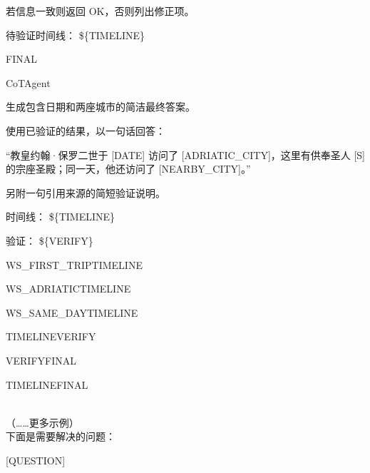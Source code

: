 \begin{userprompt}[title={用户提示词}]
若信息一致则返回 OK，否则列出修正项。

待验证时间线：
\$\{TIMELINE\}

\quad{}



\quad{}FINAL

\quad{}CoTAgent

\quad{}
生成包含日期和两座城市的简洁最终答案。

\quad{}

\qquad{}
使用已验证的结果，以一句话回答：

“教皇约翰·保罗二世于 [DATE] 访问了 [ADRIATIC\_CITY]，这里有供奉圣人 [S] 的宗座圣殿；同一天，他还访问了 [NEARBY\_CITY]。”

另附一句引用来源的简短验证说明。

时间线：
\$\{TIMELINE\}

验证：
\$\{VERIFY\}

\quad{}



\quad{}WS\_FIRST\_TRIPTIMELINE

\quad{}WS\_ADRIATICTIMELINE

\quad{}WS\_SAME\_DAYTIMELINE

\quad{}TIMELINEVERIFY

\quad{}VERIFYFINAL

\quad{}TIMELINEFINAL

\\

（……更多示例）\\

下面是需要解决的问题：

[QUESTION]


\end{userprompt}





